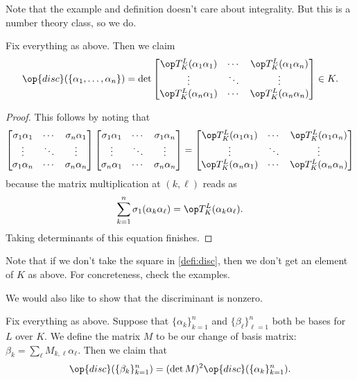 \documentclass[../notes.tex]{subfiles}
\begin{document}
Note that the example and definition doesn't care about integrality. But this is a number theory class, so we do.
\begin{prop}
    Fix everything as above. Then we claim
    \[\op{disc}(\{\alpha_1,\ldots,\alpha_n\})=\det\begin{bmatrix}
        \op T_K^L(\alpha_1\alpha_1) & \cdots & \op T_K^L(\alpha_1\alpha_n) \\
        \vdots & \ddots & \vdots \\
        \op T_K^L(\alpha_n\alpha_1) & \cdots & \op T_K^L(\alpha_n\alpha_n)
    \end{bmatrix}\in K.\]
\end{prop}
\begin{proof}
    This follows by noting that
    \[\begin{bmatrix}
        \sigma_1\alpha_1 & \cdots & \sigma_n\alpha_1 \\
        \vdots & \ddots & \vdots \\
        \sigma_1\alpha_n & \cdots & \sigma_n\alpha_n
    \end{bmatrix}
    \begin{bmatrix}
        \sigma_1\alpha_1 & \cdots & \sigma_1\alpha_n \\
        \vdots & \ddots & \vdots \\
        \sigma_n\alpha_1 & \cdots & \sigma_n\alpha_n
    \end{bmatrix}=\begin{bmatrix}
        \op T_K^L(\alpha_1\alpha_1) & \cdots & \op T_K^L(\alpha_1\alpha_n) \\
        \vdots & \ddots & \vdots \\
        \op T_K^L(\alpha_n\alpha_1) & \cdots & \op T_K^L(\alpha_n\alpha_n)
    \end{bmatrix}\]
    because the matrix multiplication at $(k,\ell)$ reads as
    \[\sum_{k=1}^n\sigma_1(\alpha_k\alpha_\ell)=\op T_K^L(\alpha_k\alpha_\ell).\]
    Taking determinants of this equation finishes.
\end{proof}
\begin{remark}
    Note that if we don't take the square in \autoref{defi:disc}, then we don't get an element of $K$ as above. For concreteness, check the examples.
\end{remark}
We would also like to show that the discriminant is nonzero.
\begin{lem} \label{lem:lem0}
    Fix everything as above. Suppose that $\{\alpha_k\}_{k=1}^n$ and $\{\beta_\ell\}_{\ell=1}^n$ both be bases for $L$ over $K.$ We define the matrix $M$ to be our change of basis matrix: $\beta_k=\sum_\ell M_{k,\ell}\alpha_\ell.$ Then we claim that
    \[\op{disc}(\{\beta_k\}_{k=1}^n)=(\det M)^2\op{disc}(\{\alpha_k\}_{k=1}^n).\]
\end{lem}
\end{document}
